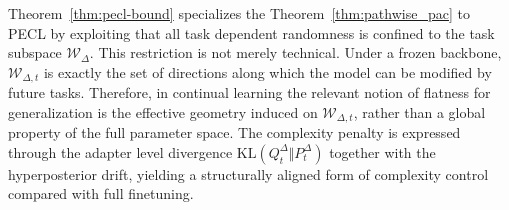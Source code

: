 \documentclass{article}
\theoremstyle{plain}
\theoremstyle{definition}
\theoremstyle{remark}
\begin{document}
Theorem~\ref{thm:pecl-bound} specializes the Theorem~\ref{thm:pathwise_pac} to PECL by exploiting that all task dependent randomness is confined to the task subspace $\mathcal W_\Delta$. This restriction is not merely technical.
Under a frozen backbone, $\mathcal W_{\Delta,t}$ is exactly the set of directions along which the model can be modified by future tasks.
Therefore, in continual learning the relevant notion of flatness for generalization is the effective geometry induced on $\mathcal W_{\Delta,t}$, rather than a global property of the full parameter space.
The complexity penalty is expressed through the adapter level divergence $\mathrm{KL}(Q_t^\Delta\Vert P_t^\Delta)$ together with the hyperposterior drift, yielding a structurally aligned form of complexity control compared with full finetuning.
\end{document}
